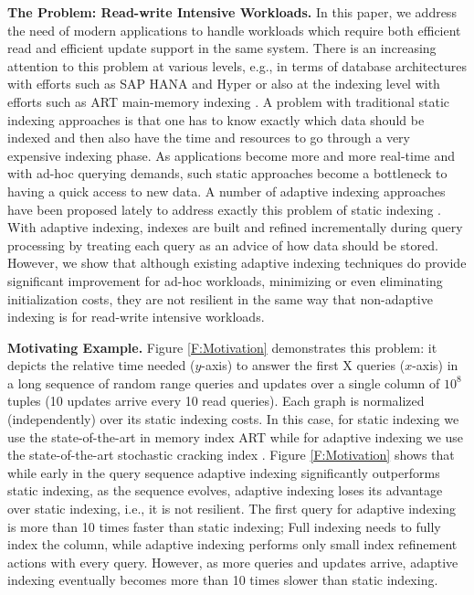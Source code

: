 \textbf{The Problem: Read-write Intensive Workloads.}
In this paper, we address the need of modern applications to handle workloads which require both efficient read and efficient update
support in the same system. 
There is an increasing attention to this problem at various levels, e.g., 
in terms of database architectures with efforts such as SAP HANA \cite{Hana} and Hyper \cite{hyper} or also at the indexing level
with efforts such as ART main-memory indexing \cite{art}.
A problem with traditional  static indexing approaches is that one has to know exactly which data should be indexed
and then also have the time and resources to go through a very expensive indexing phase.
As applications become more and more real-time and with ad-hoc querying demands, such static approaches
become a bottleneck to having a quick access to new data.
A number of adaptive indexing approaches have been proposed lately to address exactly this problem of static indexing \cite{IKM:CIDR07,hail}.
With adaptive indexing, indexes are built and refined incrementally during query processing
by treating each query as an advice of how data should be stored.
However, we show that although existing adaptive indexing techniques 
do provide significant improvement for ad-hoc workloads, minimizing or even eliminating initialization costs, 
they are not resilient in the same way that non-adaptive indexing is for read-write intensive workloads. 

\textbf{Motivating Example.}
Figure \ref{F:Motivation} demonstrates this problem: it depicts the relative time needed ($y$-axis) 
to answer the first X queries ($x$-axis) in a long sequence of random range 
queries and updates over a single column of $10^8$ tuples (10 updates arrive every 10 read queries). 
Each graph is normalized (independently) over its static indexing costs.
In this case, for static indexing we use the state-of-the-art in memory index ART \cite{art}
while for adaptive indexing we use the state-of-the-art stochastic cracking index \cite{StochasticCracking}.
Figure \ref{F:Motivation} shows that while early in the query sequence adaptive indexing 
significantly outperforms static indexing,
as the sequence evolves,
adaptive indexing loses its advantage over static indexing, i.e.,  it is not resilient.
The first query for adaptive indexing is more than 10 times faster than static indexing;
Full indexing needs to fully index the column, while adaptive indexing performs only small index refinement actions with every query.
However, as more queries and updates arrive, adaptive indexing eventually becomes more than 10 times slower than static indexing.

